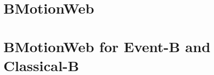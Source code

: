 \documentclass[twoside,10pt]{book}
\begin{document}
\chapter{BMotionWeb}
\label{bms}


\chapter{BMotionWeb for Event-B and Classical-B}
\label{bms4b}


%



\clearpage
{}
{}
\printindex
\end{document}
